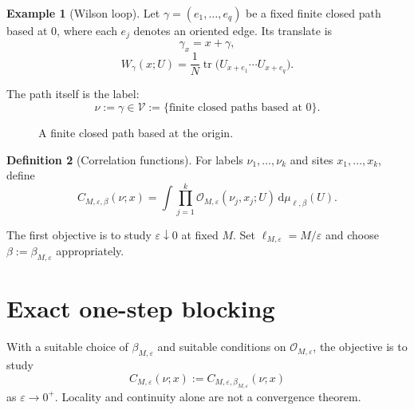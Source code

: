 \documentclass[10pt,reqno]{amsart}
\theoremstyle{definition}
\newtheorem{definition}{Definition}[section]
\newtheorem{example}[definition]{Example}
\theoremstyle{remark}
\numberwithin{equation}{section}
\numberwithin{figure}{section}
\newcommand{\dd}{\mathrm d}
\newcommand{\e}{\varepsilon}
\DeclareMathOperator{\tr}{tr}
\begin{document}
\begin{example}[Wilson loop] Let $\gamma=(e_1,\ldots,e_q)$ be a fixed finite closed path based at $0$, where each $e_j$ denotes an oriented edge. Its translate is
\begin{equation}\label{eq:display-027}
\gamma_x=x+\gamma,
\end{equation}
\begin{equation}\label{eq:display-028}
W_\gamma(x;U)=\frac1N\tr\bigl(U_{x+e_1}\cdots U_{x+e_q}\bigr).
\end{equation}



The path itself is the label:
\begin{equation}\label{eq:display-029}
\nu:=\gamma\in\mathcal V:=\{\text{finite closed paths based at $0$}\}.
\end{equation}
\end{example}

\begin{figure}[htbp]
\centering
{}
\caption{A finite closed path based at the origin.}
\label{fig:wilson-loop}
\end{figure}

\begin{definition}[Correlation functions]
For labels $\nu_1,\ldots,\nu_k$ and sites $x_1,\ldots,x_k$, define
\begin{equation}\label{eq:display-030}
C_{M,\e,\beta}(\nu;x)
 =\int\prod_{j=1}^k\mathcal O_{M,\e}(\nu_j,x_j;U)\,\dd\mu_{\ell,\beta}(U).
\end{equation}
\end{definition}

The first objective is to study $\e\downarrow0$ at fixed $M$.
Set $\ell_{M,\e}=M/\e$ and choose $\beta:=\beta_{M,\e}$ appropriately.

\section{Exact one-step blocking}
With a suitable choice of $\beta_{M,\e}$ and suitable conditions on $\mathcal O_{M,\e}$, the objective is to study
\begin{equation}\label{eq:display-031}
C_{M,\e}(\nu;x):=C_{M,\e,\beta_{M,\e}}(\nu;x)
\end{equation}
as $\e\to0^+$. Locality and continuity alone are not a convergence theorem.
\end{document}
